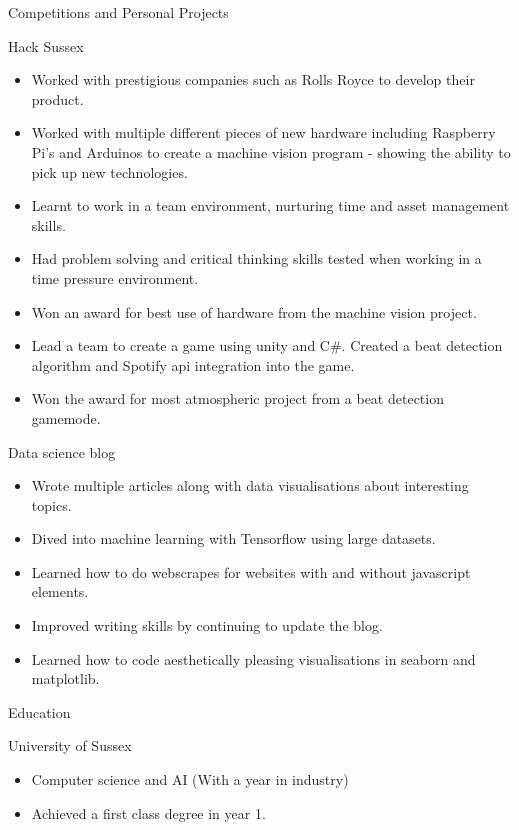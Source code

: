 \documentclass[]{article}
\newlength{\tabin}
\newlength{\secsep}
\newcommand{\lineunder}{\vspace*{-8pt} \\ \hspace*{-6pt} \hrulefill \\ \vspace*{-15pt}}
\newenvironment{tabbedsection}[1]{
  \begin{list}{}{
      \setlength{\itemsep}{0pt}
      \setlength{\labelsep}{0pt}
      \setlength{\labelwidth}{0pt}
      \setlength{\leftmargin}{\tabin}
      \setlength{\rightmargin}{\tabin}
      \setlength{\listparindent}{0pt}
      \setlength{\parsep}{0pt}
      \setlength{\parskip}{0pt}
      \setlength{\partopsep}{0pt}
      \setlength{\topsep}{#1}
    }
  \item[]
}{\end{list}}
\newenvironment{resume_section}[1]{
  \filbreak
  \vspace{2\secsep}
  \textsc{\large#1}
  \lineunder
  \begin{tabbedsection}{\secsep}
}{\end{tabbedsection}}
\newenvironment{resume_subsection}[2][]{
  \textbf{#2} \hfill {\footnotesize #1} \hspace{2em}
  \begin{tabbedsection}{0.5\secsep}
}{\end{tabbedsection}}
\newenvironment{subitems}{
  \renewcommand{\labelitemi}{-}
  \begin{itemize}
      \setlength{\labelsep}{1em}
}{\end{itemize}}
\begin{document}
\begin{resume_section}{Competitions and Personal Projects}
  \begin{resume_subsection}[(November 2018 & 2019)]{Hack Sussex}
  \begin{subitems}
    \item Worked with prestigious companies such as Rolls Royce to develop their product.
    \item Worked with multiple different pieces of new hardware including Raspberry Pi's and Arduinos to create a machine vision program - showing the ability to pick up new technologies.
    \item Learnt to work in a team environment, nurturing time and asset management skills.
    \item Had problem solving and critical thinking skills tested when working in a time pressure environment.
    \item Won an award for best use of hardware from the machine vision project.
    \item Lead a team to create a game using unity and C#. Created a beat detection algorithm and Spotify api integration into the game. 
    \item Won the award for most atmospheric project from a beat detection gamemode. 
    \end{subitems}
  \end{resume_subsection}

    \begin{resume_subsection}{Data science blog}
    \begin{subitems}
        \item Wrote multiple articles along with data visualisations about interesting topics.
        \item Dived into machine learning with Tensorflow using large datasets.
        \item Learned how to do webscrapes for websites with and without javascript elements.
        \item Improved writing skills by continuing to update the blog.
        \item Learned how to code aesthetically pleasing visualisations in seaborn and matplotlib.
    \end{subitems}
  \end{resume_subsection}
  

\begin{resume_section}{Education}
  \begin{resume_subsection}{University of Sussex}
    \begin{subitems}
      \item Computer science and AI (With a year in industry)
      \item Achieved a first class degree in year 1.
    \end{subitems}
  \end{resume_subsection}
  

\end{resume_section}
\end{resume_section}
\end{document}
